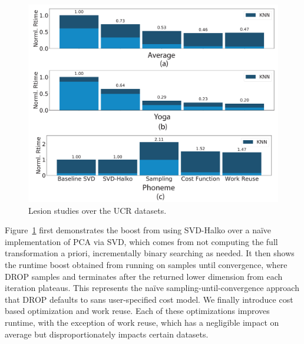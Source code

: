 \begin{figure}
\includegraphics[width=\linewidth]{figs/lesion-all.pdf}
\caption[]{Lesion studies over the UCR datasets.}
\label{fig:lesion}
\end{figure}

Figure~\ref{fig:lesion} first demonstrates the boost from using SVD-Halko over a na\"ive implementation of PCA via SVD, which comes from not computing the full transformation a priori, incrementally binary searching as needed. 
It then shows the runtime boost obtained from running on samples until convergence, where DROP samples and terminates after the returned lower dimension from each iteration plateaus.
This represents the na\"ive sampling-until-convergence approach that DROP defaults to sans user-specified cost model.
We finally introduce cost based optimization and work reuse.
Each of these optimizations improves runtime, with the exception of work reuse, which has a negligible impact on average but disproportionately impacts certain datasets. 

